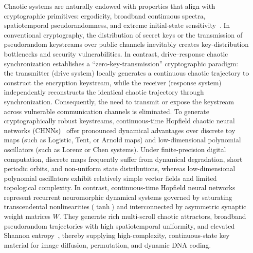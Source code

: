 \documentclass[a4paper,fleqn]{cas-sc}
\theoremstyle{plain}
\theoremstyle{definition}
\begin{document}
Chaotic systems are naturally endowed with properties that align with cryptographic primitives: ergodicity, broadband continuous spectra, spatiotemporal pseudorandomness, and extreme initial-state sensitivity~\cite{zia2022survey}. In conventional cryptography, the distribution of secret keys or the transmission of pseudorandom keystreams over public channels inevitably creates key-distribution bottlenecks and security vulnerabilities. In contrast, drive--response chaotic synchronization establishes a ``zero-key-transmission'' cryptographic paradigm: the transmitter (drive system) locally generates a continuous chaotic trajectory to construct the encryption keystream, while the receiver (response system) independently reconstructs the identical chaotic trajectory through synchronization. Consequently, the need to transmit or expose the keystream across vulnerable communication channels is eliminated. To generate cryptographically robust keystreams, continuous-time Hopfield chaotic neural networks (CHNNs)~\cite{hopfield1984neurons,LI2013a} offer pronounced dynamical advantages over discrete toy maps (such as Logistic, Tent, or Arnold maps) and low-dimensional polynomial oscillators (such as Lorenz or Chen systems). Under finite-precision digital computation, discrete maps frequently suffer from dynamical degradation, short periodic orbits, and non-uniform state distributions, whereas low-dimensional polynomial oscillators exhibit relatively simple vector fields and limited topological complexity. In contrast, continuous-time Hopfield neural networks represent recurrent neuromorphic dynamical systems governed by saturating transcendental nonlinearities ($\tanh$) and interconnected by asymmetric synaptic weight matrices $W$. They generate rich multi-scroll chaotic attractors, broadband pseudorandom trajectories with high spatiotemporal uniformity, and elevated Shannon entropy~\cite{zheng2010double,bao2017numerical,mahmoud2021analysis}, thereby supplying high-complexity, continuous-state key material for image diffusion, permutation, and dynamic DNA coding.
\end{document}
